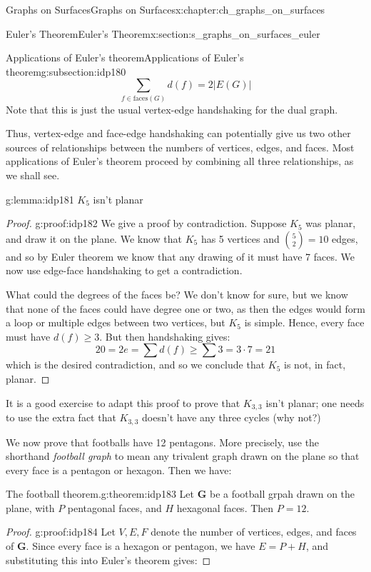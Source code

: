 \documentclass[oneside,10pt,]{book}
\numberwithin{equation}{section}
\newcommand{\bfG}{\mathbf{G}}
\begin{document}
\begin{chapterptx}{Graphs on Surfaces}{}{Graphs on Surfaces}{}{}{x:chapter:ch_graphs_on_surfaces}
\begin{sectionptx}{Euler's Theorem}{}{Euler's Theorem}{}{}{x:section:s_graphs_on_surfaces_euler}
\begin{subsectionptx}{Applications of Euler's theorem}{}{Applications of Euler's theorem}{}{}{g:subsection:idp180}
\begin{equation*}
\sum_{f\in \text{faces}(G)}d(f)=2 |E(G)|
\end{equation*}
Note that this is just the usual vertex-edge handshaking for the dual graph.%
\par
Thus, vertex-edge and face-edge handshaking can potentially give us two other sources of relationships between the numbers of vertices, edges, and faces.  Most applications of Euler's theorem proceed by combining all three relationships, as we shall see.%
\begin{lemma}{}{}{g:lemma:idp181}%
\(K_5\) isn't planar\end{lemma}
\begin{proof}{}{g:proof:idp182}
We give a proof by contradiction.  Suppose \(K_5\) was planar, and draw it on the plane.  We know that \(K_5\) has 5 vertices and \(\binom{5}{2}=10\) edges, and so by Euler theorem we know that any drawing of it must have 7 faces. We now use edge-face handshaking to get a contradiction.%
\par
What could the degrees of the faces be?  We don't know for sure, but we know that none of the faces could have degree one or two, as then the edges would form a loop or multiple edges between two vertices, but \(K_5\) is simple.  Hence, every face must have \(d(f)\geq 3\).  But then handshaking gives:%
%
\begin{equation*}
20=2e=\sum d(f)\geq \sum 3=3\cdot 7=21
\end{equation*}
which is the desired contradiction, and so we conclude that \(K_5\) is not, in fact, planar.%
\end{proof}
It is a good exercise to adapt this proof to prove that \(K_{3,3}\) isn't planar; one needs to use the extra fact that \(K_{3,3}\) doesn't have any three cycles (why not?)%
\par
We now prove that footballs have 12 pentagons.  More precisely, use the shorthand \emph{football graph} to mean any trivalent graph drawn on the plane so that every face is a pentagon or hexagon. Then we have:%
\begin{theorem}{The football theorem.}{}{g:theorem:idp183}%
Let \(\bfG\) be a football grpah drawn on the plane, with \(P\) pentagonal faces, and \(H\) hexagonal faces.  Then \(P=12\).%
\end{theorem}
\begin{proof}{}{g:proof:idp184}
Let \(V, E, F\) denote the number of vertices, edges, and faces of \(\bfG\).  Since every face is a hexagon or pentagon, we have \(E=P+H\), and substituting this into Euler's theorem gives:%

\end{proof}
\end{subsectionptx}
\end{sectionptx}
\end{chapterptx}
\end{document}
